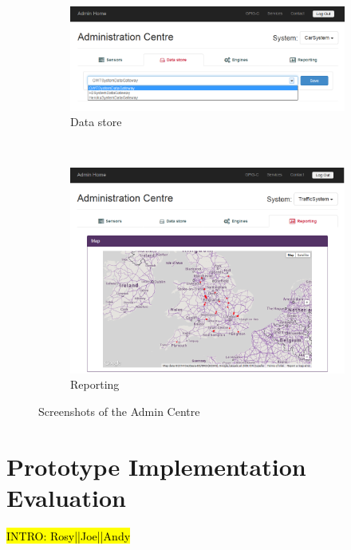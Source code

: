 \documentclass[10pt,a4paper]{article}
\begin{document}
\begin{figure}[b!]
    \begin{subfigure}{0.49\textwidth}
        \includegraphics[width=\textwidth]{images/admin-centre_data.png}
        \caption{Data store}
        \label{fig:admin-centre_data}
    \end{subfigure}
	~
	\begin{subfigure}{0.49\textwidth}
        \includegraphics[width=\textwidth]{images/admin-centre_report.png}
        \caption{Reporting}
        \label{fig:admin-centre_report}
    \end{subfigure}
    \caption{Screenshots of the Admin Centre}
	\label{fig:admin-centre}
\end{figure}

\section{Prototype Implementation Evaluation}
\label{sec:prototype}
\hl{INTRO: Rosy||Joe||Andy}
\end{document}
